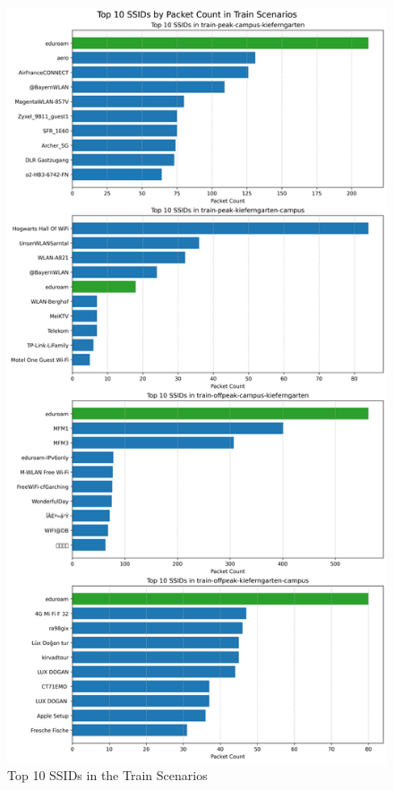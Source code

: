 \documentclass[sigconf,nonacm]{acmart}
\begin{document}
\begin{figure}
    \centering
    \includegraphics[width=\columnwidth]{images/part1/ssid/top-ssids-train-scenarios.png}
    \caption{Top 10 SSIDs in the Train Scenarios}
    \label{fig:train_ssids}
\end{figure}
\end{document}
